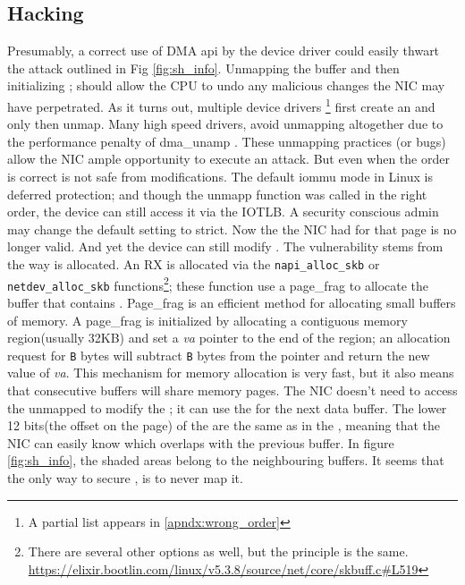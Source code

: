 \subsection{Hacking \shinfo}\label{sec:shinfo}
Presumably, a correct use of DMA api by the device driver could easily thwart the attack outlined in Fig \ref{fig:sh_info}. Unmapping the buffer and then initializing \shinfo; should allow the CPU to undo any malicious changes the NIC may have perpetrated. As it turns out, multiple device drivers \footnote{A partial list appears in \ref{apndx:wrong_order}} first create an \skb and only then unmap. Many high speed drivers, avoid unmapping altogether due to the performance penalty of dma\_unamp \cite{MMT16,MSMT18}. These unmapping practices (or bugs) allow the NIC ample opportunity to execute an attack. But even when the order is correct \shinfo is not safe from modifications. The default iommu mode in Linux is deferred protection; and though the unmapp function was called in the right order, the device can still access it via the IOTLB. A security conscious admin may change the default setting to strict. Now the \iova the NIC had for that page is no longer valid. And yet the device can still modify \shinfo. The vulnerability stems from the way \data is allocated. An RX \skb is allocated via the \texttt{napi\_alloc\_skb} or \texttt{netdev\_alloc\_skb} functions\footnote{There are several other options as well, but the principle is the same. \url{https://elixir.bootlin.com/linux/v5.3.8/source/net/core/skbuff.c\#L519}}; these function use a page\_frag to allocate the \data buffer that contains \shinfo. Page\_frag is an efficient method for allocating small buffers of memory. A page\_frag is initialized by allocating a contiguous memory region(usually 32KB) and set a \textit{va} pointer to the end of the region; an allocation request for \texttt{B} bytes will subtract \texttt{B} bytes from the pointer and return the new value of \textit{va}. 
This mechanism for memory allocation is very fast, but it also means that consecutive \data buffers will share memory pages. The NIC doesn't need to access the unmapped \iova to modify the \shinfo; it can use the \iova for the next data buffer. The lower 12 bits(the offset on the page) of the \iova  are the same as in the \kva, meaning that the NIC can easily know which \iova overlaps with the previous buffer. In figure \ref{fig:sh_info}, the shaded areas belong to the neighbouring \data buffers. It seems that the only way to secure \shinfo, is to never map it\cite{MSMT18}.

